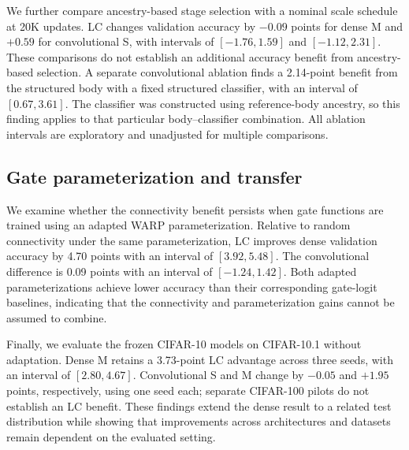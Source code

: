 We further compare ancestry-based stage selection with a nominal scale schedule at 20K updates. LC changes validation accuracy by $-0.09$ points for dense M and $+0.59$ for convolutional S, with intervals of $[-1.76,1.59]$ and $[-1.12,2.31]$. These comparisons do not establish an additional accuracy benefit from ancestry-based selection. A separate convolutional ablation finds a 2.14-point benefit from the structured body with a fixed structured classifier, with an interval of $[0.67,3.61]$. The classifier was constructed using reference-body ancestry, so this finding applies to that particular body–classifier combination. All ablation intervals are exploratory and unadjusted for multiple comparisons.

\subsection{Gate parameterization and transfer}

We examine whether the connectivity benefit persists when gate functions are trained using an adapted WARP parameterization. Relative to random connectivity under the same parameterization, LC improves dense validation accuracy by 4.70 points with an interval of $[3.92,5.48]$. The convolutional difference is 0.09 points with an interval of $[-1.24,1.42]$. Both adapted parameterizations achieve lower accuracy than their corresponding gate-logit baselines, indicating that the connectivity and parameterization gains cannot be assumed to combine.

Finally, we evaluate the frozen CIFAR-10 models on CIFAR-10.1 \cite{recht2018} without adaptation. Dense M retains a 3.73-point LC advantage across three seeds, with an interval of $[2.80,4.67]$. Convolutional S and M change by $-0.05$ and $+1.95$ points, respectively, using one seed each; separate CIFAR-100 pilots do not establish an LC benefit. These findings extend the dense result to a related test distribution while showing that improvements across architectures and datasets remain dependent on the evaluated setting.
